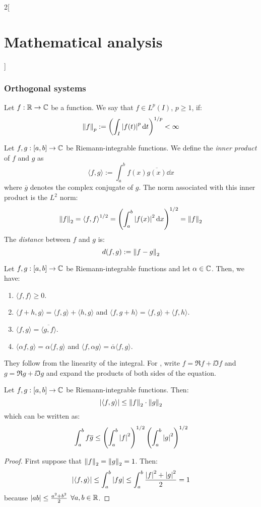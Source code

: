 \documentclass[../../../main_math.tex]{subfiles}
\begin{document}
\begin{multicols}{2}[\section{Mathematical analysis}]
  \subsubsection{Orthogonal systems}
  \begin{definition}
    Let $f:\mathbb{R} \rightarrow\mathbb{C} $ be a function. We say that $f\in L^p(I)$, $p\geq1$, if: $$\left\|f\right\|_p:=\left(\int_I\abs{f(t)}^p\dd{t}\right)^{1/p}<\infty$$
  \end{definition}
  \begin{definition}
    Let $f,g:[a,b]\rightarrow\mathbb{C} $ be Riemann-integrable functions. We define the \emph{inner product} of $f$ and $g$ as $$\langle f,g\rangle:=\int_a^bf(x)\overline{g(x)}\dd{x}$$ where $\overline{g}$ denotes the complex conjugate of $g$. The norm associated with this inner product is the $L^2$ norm: $$\left\|f\right\|_2={\langle f,f\rangle}^{1/2}=\left(\int_a^b{|f(x)|}^2\dd{x}\right)^{1/2}=\left\|f\right\|_2$$ The \emph{distance} between $f$ and $g$ is: $$d(f,g):=\left\|f-g\right\|_2$$
  \end{definition}
  \begin{proposition}
    Let $f,g:[a,b]\rightarrow\mathbb{C} $ be Riemann-integrable functions and let $\alpha\in\mathbb{C} $. Then, we have:
    \begin{enumerate}
      \item $\langle f,f\rangle\geq 0$.
      \item $\langle f+h,g\rangle=\langle f,g\rangle+\langle h,g\rangle$ and $\langle f,g+h\rangle=\langle f,g\rangle+\langle f,h\rangle$.
            \item\label{MA:orto3} $\langle f,g\rangle=\overline{\langle g,f\rangle}$.
      \item $\langle \alpha f,g\rangle=\alpha\langle f,g\rangle$ and $\langle f,\alpha g\rangle=\overline{\alpha}\langle f,g\rangle$.
    \end{enumerate}
  \end{proposition}
  \begin{sproof}
    They follow from the linearity of the integral. For , write $f=\Re f+\ii \Im f$ and $g=\Re g+\ii \Im g$ and expand the products of both sides of the equation.
  \end{sproof}
  \begin{theorem}\label{MA:cauchyschwarz}
    Let $f,g:[a,b]\rightarrow\mathbb{C} $ be Riemann-integrable functions. Then: $$\abs{\langle f,g\rangle}\leq{\left\|f\right\|_2}\cdot{\left\|g\right\|_2}$$ which can be written as: $$\int_a^bf\overline{g}\leq\left(\int_a^b\abs{f}^2\right)^{1/2}\left(\int_a^b\abs{g}^2\right)^{1/2}$$
  \end{theorem}
  \begin{proof}
    First suppose that ${\left\|f\right\|_2}={\left\|g\right\|_2}=1$. Then:
    $$\abs{\langle f,g\rangle}\leq\int_a^b\abs{fg}\leq\int_a^b\frac{\abs{f}^2+\abs{g}^2}{2}=1$$
    because $\abs{ab}\leq \frac{a^2+b^2}{2}$ $\forall a,b\in\mathbb{R}$.


\end{proof}
\end{multicols}
\end{document}
